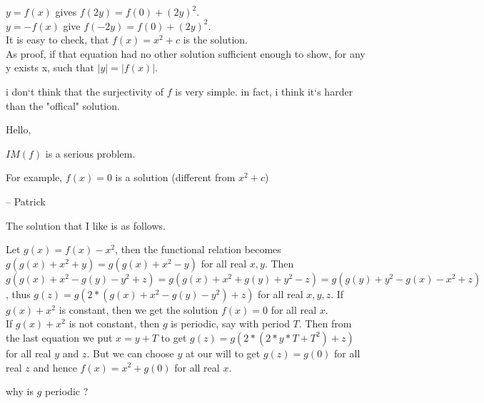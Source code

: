 \begin{mysolution}
	$y=f(x)$ gives $f(2y)=f(0)+(2y)^{2}.$\\
$y=-f(x)$ give $f(-2y)=f(0)+(2y)^{2}.$\\
It is easy to check, that $f(x)=x^{2}+c$ is the solution.\\ 
As proof, if that equation had no other solution sufficient enough to show, for any y exists x, such that $|y|=|f(x)|$.
\end{mysolution}



\begin{mysolution}
	i don`t think that the surjectivity of $f$ is very simple. in fact, i think it`s harder than the "offical" solution.
\end{mysolution}



\begin{mysolution}
	Hello,

$IM(f)$ is a serious problem.

For example, $f(x) = 0$ is a solution (different from $x^2 + c$)

-- 
Patrick
\end{mysolution}



\begin{mysolution}
	The solution that I like is as follows.

Let $g(x)=f(x)-x^2$, then the functional relation becomes $g(g(x)+x^2+y)=g(g(x)+x^2-y)$ for all real $x,y$. Then $g(g(x)+x^2-g(y)-y^2+z)=g(g(x)+x^2+g(y)+y^2-z)=g(g(y)+y^2-g(x)-x^2+z)$, thus
$g(z)=g(2*(g(x)+x^2-g(y)-y^2) +z)$ for all real $x,y,z$. If $g(x)+x^2$ is constant, then we get the solution $f(x)=0$ for all real $x$. \\ If $g(x)+x^2$ is not constant, then $g$ is periodic, say with period $T$. Then from the last equation we put $x=y+T$ to get $g(z)=g(2*(2*y*T+T^2)+z)$ for all real $y$ and $z$. But we can choose $y$ at our will to get $g(z)=g(0)$ for all real $z$ and hence $f(x)=x^2+g(0)$ for all real $x$.
\end{mysolution}



\begin{mysolution}
	why is $g$ periodic ?
\end{mysolution}



